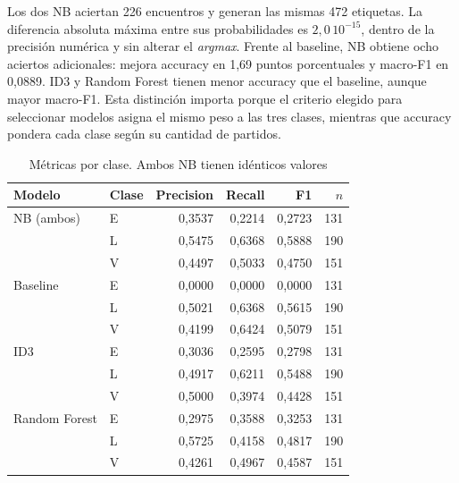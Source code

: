 \documentclass[conference]{IEEEtran}
\begin{document}
Los dos NB aciertan 226 encuentros y generan las mismas 472 etiquetas. La diferencia absoluta máxima entre sus probabilidades es $2{,}0\,10^{-15}$, dentro de la precisión numérica y sin alterar el \textit{argmax}. Frente al baseline, NB obtiene ocho aciertos adicionales: mejora accuracy en 1,69 puntos porcentuales y macro-F1 en 0,0889. ID3 y Random Forest tienen menor accuracy que el baseline, aunque mayor macro-F1. Esta distinción importa porque el criterio elegido para seleccionar modelos asigna el mismo peso a las tres clases, mientras que accuracy pondera cada clase según su cantidad de partidos.

\begin{table}[htbp]
\caption{Métricas por clase. Ambos NB tienen idénticos valores}
\label{tab:clases}
\centering
\scriptsize
\begin{tabular}{llrrrr}
\hline
Modelo & Clase & Precision & Recall & F1 & $n$ \\
\hline
NB (ambos) & E & 0,3537 & 0,2214 & 0,2723 & 131 \\
 & L & 0,5475 & 0,6368 & 0,5888 & 190 \\
 & V & 0,4497 & 0,5033 & 0,4750 & 151 \\
Baseline & E & 0,0000 & 0,0000 & 0,0000 & 131 \\
 & L & 0,5021 & 0,6368 & 0,5615 & 190 \\
 & V & 0,4199 & 0,6424 & 0,5079 & 151 \\
ID3 & E & 0,3036 & 0,2595 & 0,2798 & 131 \\
 & L & 0,4917 & 0,6211 & 0,5488 & 190 \\
 & V & 0,5000 & 0,3974 & 0,4428 & 151 \\
Random Forest & E & 0,2975 & 0,3588 & 0,3253 & 131 \\
 & L & 0,5725 & 0,4158 & 0,4817 & 190 \\
 & V & 0,4261 & 0,4967 & 0,4587 & 151 \\
\hline
\end{tabular}
\end{table}
\end{document}
